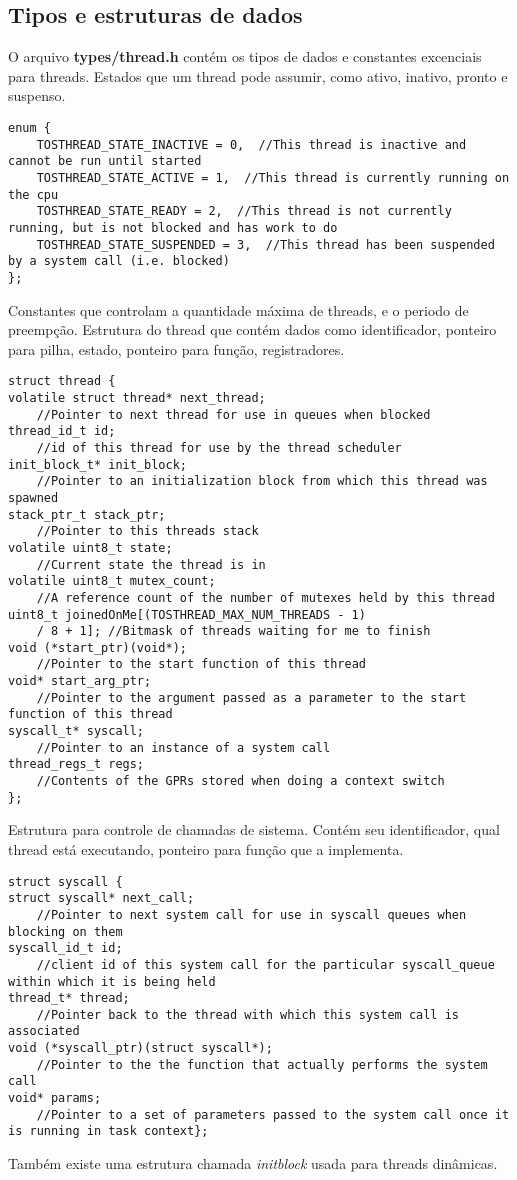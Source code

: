 \documentclass[a4paper,onecolumn, 10pt]{article}
\begin{document}
\subsection{Tipos e estruturas de dados}
O arquivo \textbf{types/thread.h} contém os tipos de dados e constantes excenciais para threads.
Estados que um thread pode assumir, como ativo, inativo, pronto e suspenso.
\begin{lstlisting}
enum {
    TOSTHREAD_STATE_INACTIVE = 0,  //This thread is inactive and cannot be run until started
    TOSTHREAD_STATE_ACTIVE = 1,  //This thread is currently running on the cpu
    TOSTHREAD_STATE_READY = 2,  //This thread is not currently running, but is not blocked and has work to do 
    TOSTHREAD_STATE_SUSPENDED = 3,  //This thread has been suspended by a system call (i.e. blocked)
};
\end{lstlisting}
Constantes que controlam a quantidade máxima de threads, e o periodo de preempção.
Estrutura do thread que contém dados como identificador, ponteiro para pilha, estado, ponteiro para função,
registradores.
\begin{lstlisting}
struct thread {
volatile struct thread* next_thread;  
    //Pointer to next thread for use in queues when blocked
thread_id_t id;                       
    //id of this thread for use by the thread scheduler
init_block_t* init_block;             
    //Pointer to an initialization block from which this thread was spawned
stack_ptr_t stack_ptr;                
    //Pointer to this threads stack
volatile uint8_t state;               
    //Current state the thread is in
volatile uint8_t mutex_count;         
    //A reference count of the number of mutexes held by this thread
uint8_t joinedOnMe[(TOSTHREAD_MAX_NUM_THREADS - 1) 
    / 8 + 1]; //Bitmask of threads waiting for me to finish
void (*start_ptr)(void*);             
    //Pointer to the start function of this thread
void* start_arg_ptr;                  
    //Pointer to the argument passed as a parameter to the start function of this thread
syscall_t* syscall;                   
    //Pointer to an instance of a system call
thread_regs_t regs;                   
    //Contents of the GPRs stored when doing a context switch
};
\end{lstlisting}
Estrutura para controle de chamadas de sistema. Contém seu identificador, qual thread está executando, 
ponteiro para função que a implementa.
\begin{lstlisting}
struct syscall {
struct syscall* next_call;        
    //Pointer to next system call for use in syscall queues when blocking on them
syscall_id_t id;                  
    //client id of this system call for the particular syscall_queue within which it is being held
thread_t* thread;                 
    //Pointer back to the thread with which this system call is associated
void (*syscall_ptr)(struct syscall*);   
    //Pointer to the the function that actually performs the system call
void* params;                     
    //Pointer to a set of parameters passed to the system call once it is running in task context};
\end{lstlisting}
Também existe uma estrutura chamada \textit{initblock} usada para threads dinâmicas.
\end{document}

